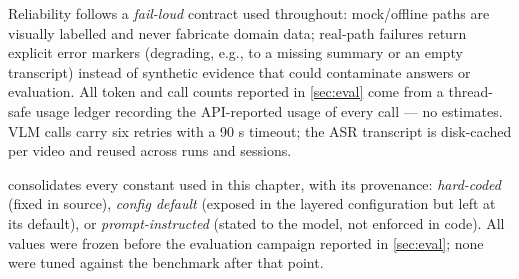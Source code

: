 Reliability follows a \emph{fail-loud} contract used throughout: mock/offline paths are visually
labelled and never fabricate domain data; real-path failures return explicit error markers
(degrading, e.g., to a missing summary or an empty transcript) instead of synthetic evidence that
could contaminate answers or evaluation. All token and call counts reported in \cref{sec:eval} come from a
thread-safe usage ledger recording the API-reported usage of every call --- no estimates. VLM calls
carry six retries with a 90 s timeout; the ASR transcript is disk-cached per video and reused
across runs and sessions.

 consolidates every constant used in this chapter, with its provenance: \emph{hard-coded}
(fixed in source), \emph{config default} (exposed in the layered configuration but left at its
default), or \emph{prompt-instructed} (stated to the model, not enforced in code). All values were
frozen before the evaluation campaign reported in \cref{sec:eval}; none were tuned against the benchmark
after that point.

